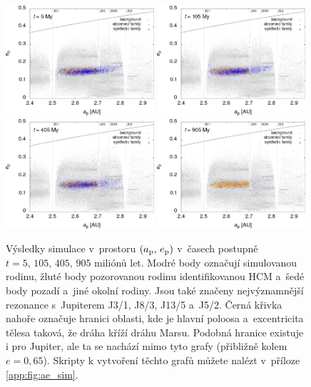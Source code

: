 \documentclass[A4paper, 12pt, oneside]{book}
\begin{document}
\immediate{}
\immediate{}
\immediate{}
\immediate{}
\begin{figure}
	\centering
	\includegraphics[width=0.49\textwidth]{obr/ae_5t.png}
	\includegraphics[width=0.49\textwidth]{obr/ae_105t.png}\\
	\includegraphics[width=0.49\textwidth]{obr/ae_405t.png}
	\includegraphics[width=0.49\textwidth]{obr/ae_905t.png}
	\caption{Výsledky simulace v~prostoru $(a_{\rm p},\,e_{\rm p})$ v~časech postupně $t=5,\,105,\,405,\,905$ miliónů let. Modré body označují simulovanou rodinu, žluté body pozorovanou rodinu identifikovanou HCM a~šedé body pozadí a~jiné okolní rodiny. Jsou také značeny nejvýznamnější rezonance s~Jupiterem J3/1, J8/3, J13/5 a~J5/2. Černá křivka nahoře označuje hranici oblasti, kde je hlavní poloosa a~excentricita tělesa taková, že dráha kříží dráhu Marsu. Podobná hranice existuje i pro Jupiter, ale ta se nachází mimo tyto grafy (přibližně kolem $e=0,65$). Skripty k vytvoření těchto grafů můžete nalézt v~příloze \ref{app:fig:ae_sim}.} \label{fig:ae_sim}
\end{figure}	
\end{document}
